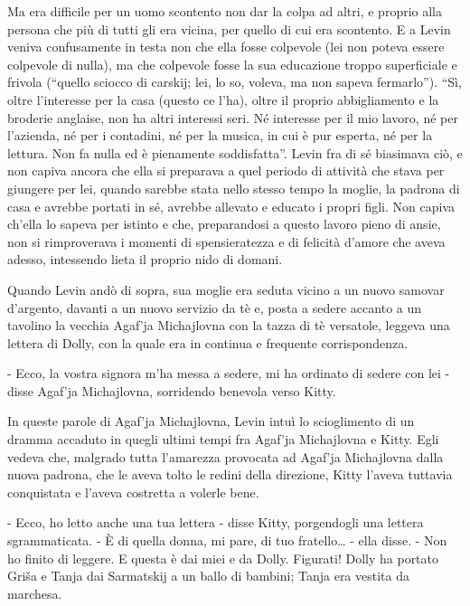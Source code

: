 Ma era difficile per un uomo scontento non dar la colpa ad altri, e proprio alla persona che più di tutti gli era vicina, per quello di cui era scontento. E a Levin veniva confusamente in testa non che ella fosse colpevole (lei non poteva essere colpevole di nulla), ma che colpevole fosse la sua educazione troppo superficiale e frivola (``quello sciocco di carskij; lei, lo so, voleva, ma non sapeva fermarlo''). ``Sì, oltre l'interesse per la casa (questo ce l'ha), oltre il proprio abbigliamento e la broderie anglaise, non ha altri interessi seri. Né interesse per il mio lavoro, né per l'azienda, né per i contadini, né per la musica, in cui è pur esperta, né per la lettura. Non fa nulla ed è pienamente soddisfatta''. Levin fra di sé biasimava ciò, e non capiva ancora che ella si preparava a quel periodo di attività che stava per giungere per lei, quando sarebbe stata nello stesso tempo la moglie, la padrona di casa e avrebbe portati in sé, avrebbe allevato e educato i propri figli. Non capiva ch'ella lo sapeva per istinto e che, preparandosi a questo lavoro pieno di ansie, non si rimproverava i momenti di spensieratezza e di felicità d'amore che aveva adesso, intessendo lieta il proprio nido di domani. 

Quando Levin andò di sopra, sua moglie era seduta vicino a un nuovo samovar d'argento, davanti a un nuovo servizio da tè e, posta a sedere accanto a un tavolino la vecchia Agaf'ja Michajlovna con la tazza di tè versatole, leggeva una lettera di Dolly, con la quale era in continua e frequente corrispondenza. 

- Ecco, la vostra signora m'ha messa a sedere, mi ha ordinato di sedere con lei - disse Agaf'ja Michajlovna, sorridendo benevola verso Kitty. 

In queste parole di Agaf'ja Michajlovna, Levin intuì lo scioglimento di un dramma accaduto in quegli ultimi tempi fra Agaf'ja Michajlovna e Kitty. Egli vedeva che, malgrado tutta l'amarezza provocata ad Agaf'ja Michajlovna dalla nuova padrona, che le aveva tolto le redini della direzione, Kitty l'aveva tuttavia conquistata e l'aveva costretta a volerle bene. 

- Ecco, ho letto anche una tua lettera - disse Kitty, porgendogli una lettera sgrammaticata. - È di quella donna, mi pare, di tuo fratello\ldots{} - ella disse. - Non ho finito di leggere. E questa è dai miei e da Dolly. Figurati! Dolly ha portato Griša e Tanja dai Sarmatskij a un ballo di bambini; Tanja era vestita da marchesa. 

